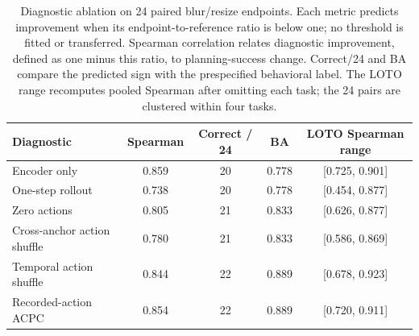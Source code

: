 \begin{table}[H]
\centering
\caption{Diagnostic ablation on 24 paired blur/resize endpoints. Each metric predicts improvement when its endpoint-to-reference ratio is below one; no threshold is fitted or transferred. Spearman correlation relates diagnostic improvement, defined as one minus this ratio, to planning-success change. Correct/24 and BA compare the predicted sign with the prespecified behavioral label. The LOTO range recomputes pooled Spearman after omitting each task; the 24 pairs are clustered within four tasks.}
\label{tab:cross-stressor-diagnostic-ablation}
\small
\setlength{\tabcolsep}{4pt}
\begin{tabular}{lcccc}
\toprule
Diagnostic & Spearman & Correct / 24 & BA & LOTO Spearman range \\
\midrule
Encoder only & 0.859 & 20 & 0.778 & [0.725, 0.901] \\
One-step rollout & 0.738 & 20 & 0.778 & [0.454, 0.877] \\
Zero actions & 0.805 & 21 & 0.833 & [0.626, 0.877] \\
Cross-anchor action shuffle & 0.780 & 21 & 0.833 & [0.586, 0.869] \\
Temporal action shuffle & 0.844 & 22 & 0.889 & [0.678, 0.923] \\
Recorded-action ACPC & 0.854 & 22 & 0.889 & [0.720, 0.911] \\
\bottomrule
\end{tabular}
\end{table}
